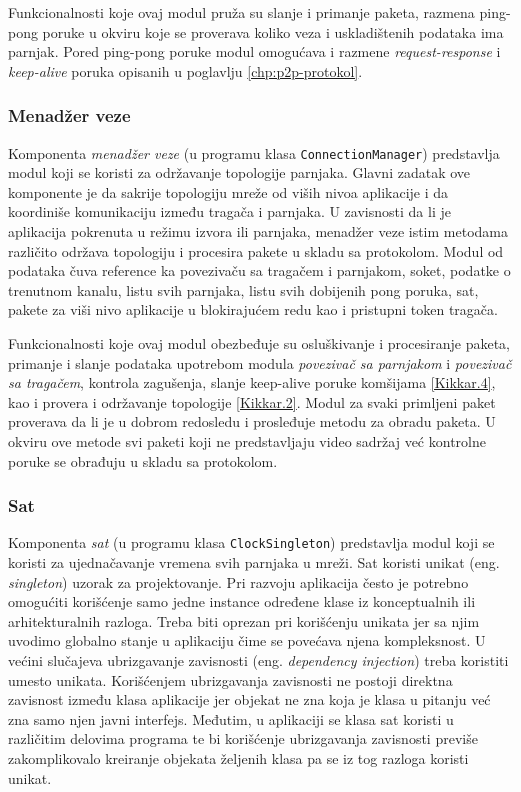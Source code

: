 \documentclass[12pt,oneside]{memoir}
\begin{document}
Funkcionalnosti koje ovaj modul pruža su slanje i primanje paketa, razmena ping-pong poruke u okviru koje se proverava koliko veza i uskladištenih podataka ima parnjak. Pored ping-pong poruke modul omogućava i razmene \textit{request-response} i \textit{keep-alive} poruka opisanih u poglavlju \ref{chp:p2p-protokol}. 
			

\subsubsection{Menadžer veze}
\label{implementacija.2.3.3}

Komponenta \textit{menadžer veze} (u programu klasa \texttt{ConnectionManager}) predstavlja modul koji se koristi za održavanje topologije parnjaka. Glavni zadatak ove komponente je da sakrije topologiju mreže od viših nivoa aplikacije i da koordiniše komunikaciju između tragača i parnjaka. U zavisnosti da li je aplikacija pokrenuta u režimu izvora ili parnjaka, menadžer veze istim metodama različito održava topologiju i procesira pakete u skladu sa protokolom. Modul od podataka čuva reference ka povezivaču sa tragačem i parnjakom, soket, podatke o trenutnom kanalu, listu svih parnjaka, listu svih dobijenih pong poruka, sat, pakete za viši nivo aplikacije u blokirajućem redu kao i pristupni token tragača.

Funkcionalnosti koje ovaj modul obezbeđuje su osluškivanje i procesiranje paketa, primanje i slanje podataka upotrebom modula \textit{povezivač sa parnjakom} i \textit{povezivač sa tragačem}, kontrola zagušenja, slanje keep-alive poruke komšijama \ref{Kikkar.4}, kao i provera i održavanje topologije \ref{Kikkar.2}. Modul za svaki primljeni paket proverava da li je u dobrom redosledu i prosleđuje metodu za obradu paketa. U okviru ove metode svi paketi koji ne predstavljaju video sadržaj već kontrolne poruke se obrađuju u skladu sa protokolom. 


\subsubsection{Sat}
\label{implementacija.2.3.4}

Komponenta \textit{sat} (u programu klasa \texttt{ClockSingleton}) predstavlja modul koji se koristi za ujednačavanje vremena svih parnjaka u mreži. Sat koristi unikat (eng. \textit{singleton}) uzorak za projektovanje. Pri razvoju aplikacija često je potrebno omogućiti korišćenje samo jedne instance određene klase iz konceptualnih ili arhitekturalnih razloga. Treba biti oprezan pri korišćenju unikata jer sa njim uvodimo globalno stanje u aplikaciju čime se povećava njena kompleksnost. U većini slučajeva ubrizgavanje zavisnosti (eng. \textit{dependency injection}) treba koristiti umesto unikata. Korišćenjem ubrizgavanja zavisnosti ne postoji direktna zavisnost između klasa aplikacije jer objekat ne zna koja je klasa u pitanju već zna samo njen javni interfejs. Međutim, u aplikaciji se klasa sat koristi u različitim delovima programa te bi korišćenje ubrizgavanja zavisnosti previše zakomplikovalo kreiranje objekata željenih klasa pa se iz tog razloga koristi unikat.
\end{document}
